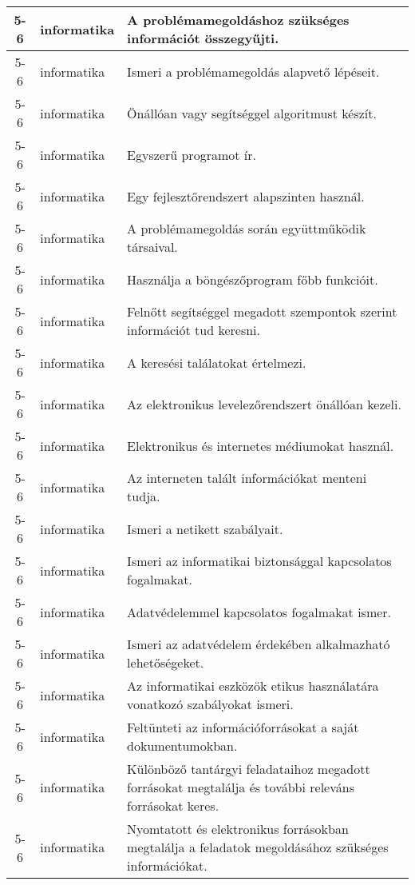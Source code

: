 \begin{small}
\begin{longtable}{c | p{2cm} |  p{11cm} }
              5-6 & informatika & A problémamegoldáshoz szükséges információt összegyűjti. \\ \hline
              5-6 & informatika & Ismeri a problémamegoldás alapvető lépéseit. \\ \hline
              5-6 & informatika & Önállóan vagy segítséggel algoritmust készít. \\ \hline
              5-6 & informatika & Egyszerű programot ír. \\ \hline
              5-6 & informatika & Egy fejlesztőrendszert alapszinten használ. \\ \hline
              5-6 & informatika & A problémamegoldás során együttműködik társaival. \\ \hline
              5-6 & informatika & Használja a böngészőprogram főbb funkcióit. \\ \hline
              5-6 & informatika & Felnőtt segítséggel megadott szempontok szerint információt tud keresni. \\ \hline
              5-6 & informatika & A keresési találatokat értelmezi. \\ \hline
              5-6 & informatika & Az elektronikus levelezőrendszert önállóan kezeli. \\ \hline
              5-6 & informatika & Elektronikus és internetes médiumokat használ. \\ \hline
              5-6 & informatika & Az interneten talált információkat menteni tudja. \\ \hline
              5-6 & informatika & Ismeri a netikett szabályait. \\ \hline
              5-6 & informatika & Ismeri az informatikai biztonsággal kapcsolatos fogalmakat. \\ \hline
              5-6 & informatika & Adatvédelemmel kapcsolatos fogalmakat ismer. \\ \hline
              5-6 & informatika & Ismeri az adatvédelem érdekében alkalmazható lehetőségeket. \\ \hline
              5-6 & informatika & Az informatikai eszközök etikus használatára vonatkozó szabályokat ismeri. \\ \hline
              5-6 & informatika & Feltünteti az információforrásokat a saját dokumentumokban. \\ \hline
              5-6 & informatika & Különböző tantárgyi feladataihoz megadott forrásokat megtalálja és további releváns forrásokat keres. \\ \hline
              5-6 & informatika & Nyomtatott és elektronikus forrásokban megtalálja a feladatok megoldásához szükséges információkat. \\ \hline

\end{longtable}
\end{small}
